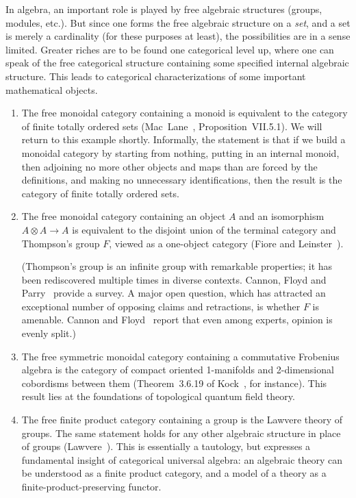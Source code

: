 In algebra, an important role is played by free algebraic structures
(groups, modules, etc.).  But since one forms the free algebraic structure
on a \emph{set}, and a set is merely a cardinality (for these purposes at
least), the possibilities are in a sense limited.  Greater riches are to be
found one categorical level up, where one can speak of the free categorical
structure containing some specified internal algebraic structure.  This
leads to categorical characterizations of some important
mathematical objects.
% 
\begin{examples}
\begin{enumerate}
\item 
The free monoidal category containing a monoid%
% 
% 
is equivalent to the
category of finite totally ordered%
%
% 
sets (Mac~Lane~\cite{MacLCWM}, Proposition~VII.5.1).  We will return to
this example shortly.  Informally, the statement is that if we build a
monoidal category by starting from nothing, putting in an internal monoid,
then adjoining no more other objects and maps than are forced by the
definitions, and making no unnecessary identifications, then the result is
the category of finite totally ordered sets.

\item
The free monoidal category containing an object $A$ and an isomorphism $A
\otimes A \to A$ is equivalent to the disjoint union of the terminal
category and Thompson's%
%
% 
group $F$, viewed as a one-object category (Fiore%
%
%  
and Leinster~\cite{ACTGF}).  

(Thompson's group is an infinite group with remarkable properties; it
has been rediscovered multiple times in diverse contexts.  Cannon, Floyd and
Parry~\cite{CFP} provide a survey.  A major open question, which
has attracted an exceptional number of opposing claims and retractions, is
whether $F$ is amenable.  Cannon and Floyd~\cite{CaFl} report that even
among experts, opinion is evenly split.)

\item
The free symmetric monoidal category containing a commutative Frobenius
algebra is the category of compact oriented 1-manifolds and 2-dimensional
cobordisms between them (Theorem~3.6.19 of Kock~\cite{KockFA2}, for
instance).  This result lies at the foundations of topological%
%
% 
quantum field theory.

\item
The free finite product category containing a group is the
Lawvere%
%
% 
theory of groups.  The same statement holds for any other algebraic
structure in place of groups (Lawvere~\cite{LawvFSA}).  This is essentially
a tautology, but expresses a fundamental insight of categorical universal
algebra: an algebraic theory can be understood as a finite product
category, and a model of a theory as a finite-product-preserving functor.
\end{enumerate}
\end{examples}

